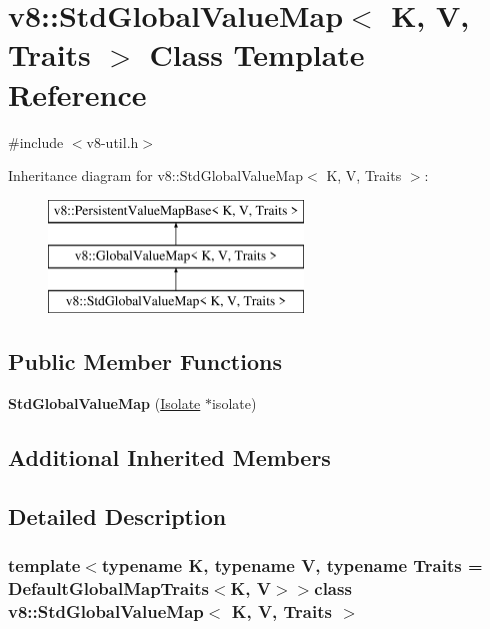 \hypertarget{classv8_1_1_std_global_value_map}{}\section{v8\+:\+:Std\+Global\+Value\+Map$<$ K, V, Traits $>$ Class Template Reference}
\label{classv8_1_1_std_global_value_map}


{\ttfamily \#include $<$v8-\/util.\+h$>$}

Inheritance diagram for v8\+:\+:Std\+Global\+Value\+Map$<$ K, V, Traits $>$\+:\begin{figure}[H]
\begin{center}
\leavevmode
\includegraphics[height=3.000000cm]{classv8_1_1_std_global_value_map}
\end{center}
\end{figure}
\subsection*{Public Member Functions}
\begin{DoxyCompactItemize}
\item 
\hypertarget{classv8_1_1_std_global_value_map_af1025915a269b8b37af93ffc2ad5c3b1}{}{\bfseries Std\+Global\+Value\+Map} (\hyperlink{classv8_1_1_isolate}{Isolate} $\ast$isolate)\label{classv8_1_1_std_global_value_map_af1025915a269b8b37af93ffc2ad5c3b1}

\end{DoxyCompactItemize}
\subsection*{Additional Inherited Members}


\subsection{Detailed Description}
\subsubsection*{template$<$typename K, typename V, typename Traits = Default\+Global\+Map\+Traits$<$\+K, V$>$$>$class v8\+::\+Std\+Global\+Value\+Map$<$ K, V, Traits $>$}

